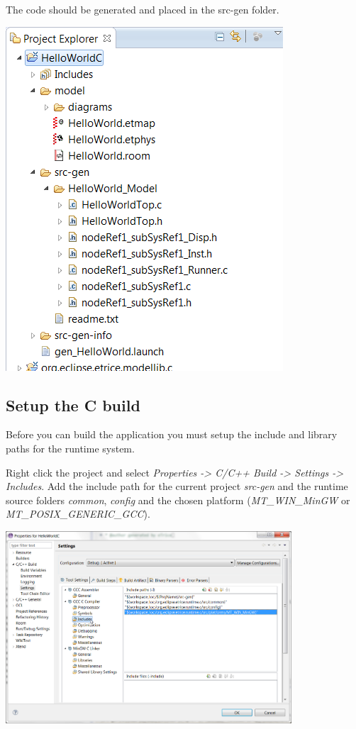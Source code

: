 The code should be generated and placed in the src-gen folder.

\includegraphics{images/016-HelloWorldC13.png}

\subsection{Setup the C build}

Before you can build the application you must setup the include and library paths for the runtime system. 

Right click the project and select \textit{Properties -> C/C++ Build -> Settings -> Includes}. 
Add the include path for the current project \emph{src-gen} and the runtime source folders \emph{common}, \emph{config} and the chosen platform (\emph{MT\_WIN\_MinGW} or \emph{MT\_POSIX\_GENERIC\_GCC}).

\includegraphics[width=0.8\textwidth]{images/016-HelloWorldC14.png}

